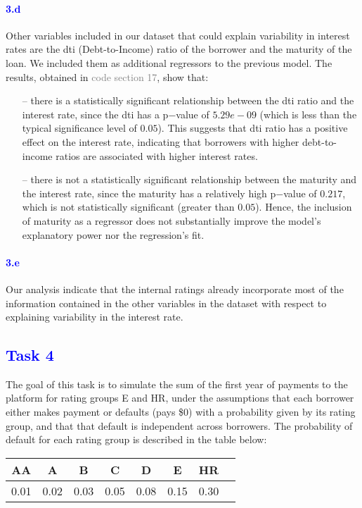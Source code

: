 \documentclass[a4paper,12pt]{article}
\begin{document}
\paragraph{\textcolor{Blue}{3.d}} Other variables included in our dataset that could explain variability in interest rates are the dti (Debt-to-Income) ratio of the borrower and the maturity of the loan. We included them as additional regressors to the previous model. The results, obtained in \textcolor{gray}{code section 17}, show that:
\begin{itemize}
    \item[--] there is a statistically significant relationship between the dti ratio and the interest rate, since the dti has a p$-$value of $5.29e-09$ (which is less than the typical significance level of $0.05$). This suggests that dti ratio has a positive effect on the interest rate, indicating that borrowers with higher debt-to-income ratios are associated with higher interest rates.
    \item[--] there is not a statistically significant relationship between the maturity and the interest rate, since the maturity has a relatively high p$-$value of $0.217$, which is not statistically significant (greater than $0.05$). Hence, the inclusion of maturity as a regressor does not substantially improve the model's explanatory power nor the regression's fit.
\end{itemize}

\paragraph{\textcolor{Blue}{3.e}} Our analysis indicate that the internal ratings already incorporate most of the information contained in the other variables in the dataset with respect to explaining variability in the interest rate.
\pagebreak
\textcolor{Blue}{\section{Task 4}}
The goal of this task is to simulate the sum of the first year of payments to the platform for rating groups E and HR, under the assumptions that each borrower either makes payment or defaults (pays \$0) with a probability given by its rating group, and that that default is independent across borrowers. 
The probability of default for each rating group is described in the table below:
\begin{table}[H]
    \centering
    \begin{tabular}{|c|c|c|c|c|c|c|c|}
        \hline
        AA & A & B & C & D & E & HR \\
        \hline
        0.01 & 0.02 & 0.03 & 0.05 & 0.08 & 0.15 & 0.30 \\
        \hline
    \end{tabular}
\end{table}
\end{document}
